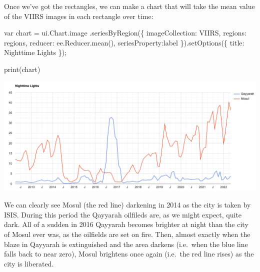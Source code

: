 \documentclass[
  letterpaper,
  DIV=11,
  numbers=noendperiod]{scrreprt}
\newenvironment{Shaded}{\begin{snugshade}}{\end{snugshade}}
\newcommand{\AttributeTok}[1]{\textcolor[rgb]{0.40,0.45,0.13}{#1}}
\newcommand{\DataTypeTok}[1]{\textcolor[rgb]{0.68,0.00,0.00}{#1}}
\newcommand{\FunctionTok}[1]{\textcolor[rgb]{0.28,0.35,0.67}{#1}}
\newcommand{\KeywordTok}[1]{\textcolor[rgb]{0.00,0.23,0.31}{#1}}
\newcommand{\NormalTok}[1]{\textcolor[rgb]{0.00,0.23,0.31}{#1}}
\newcommand{\OperatorTok}[1]{\textcolor[rgb]{0.37,0.37,0.37}{#1}}
\newcommand{\StringTok}[1]{\textcolor[rgb]{0.13,0.47,0.30}{#1}}
\begin{document}
Once we've got the rectangles, we can make a chart that will take the
mean value of the VIIRS images in each rectangle over time:

\begin{Shaded}
\begin{Highlighting}[]
\KeywordTok{var}\NormalTok{ chart }\OperatorTok{=}
\NormalTok{    ui}\OperatorTok{.}\AttributeTok{Chart}\OperatorTok{.}\AttributeTok{image}
        \OperatorTok{.}\FunctionTok{seriesByRegion}\NormalTok{(\{}
          \DataTypeTok{imageCollection}\OperatorTok{:}\NormalTok{ VIIRS}\OperatorTok{,}
          \DataTypeTok{regions}\OperatorTok{:}\NormalTok{ regions}\OperatorTok{,}
          \DataTypeTok{reducer}\OperatorTok{:}\NormalTok{ ee}\OperatorTok{.}\AttributeTok{Reducer}\OperatorTok{.}\FunctionTok{mean}\NormalTok{()}\OperatorTok{,}
          \DataTypeTok{seriesProperty}\OperatorTok{:}\StringTok{\textquotesingle{}label\textquotesingle{}}
\NormalTok{        \})}\OperatorTok{.}\FunctionTok{setOptions}\NormalTok{(\{}
          \DataTypeTok{title}\OperatorTok{:} \StringTok{\textquotesingle{}Nighttime Lights\textquotesingle{}}
\NormalTok{        \})}\OperatorTok{;}
        
\FunctionTok{print}\NormalTok{(chart)}
\end{Highlighting}
\end{Shaded}

\includegraphics{././images/qayyarah_chart.png}

We can clearly see Mosul (the red line) darkening in 2014 as the city is
taken by ISIS. During this period the Qayyarah oilfileds are, as we
might expect, quite dark. All of a sudden in 2016 Qayyarah becomes
brighter at night than the city of Mosul ever was, as the oilfields are
set on fire. Then, almost exactly when the blaze in Qayyarah is
extinguished and the area darkens (i.e.~when the blue line falls back to
near zero), Mosul brightens once again (i.e.~the red line rises) as the
city is liberated.
\end{document}
